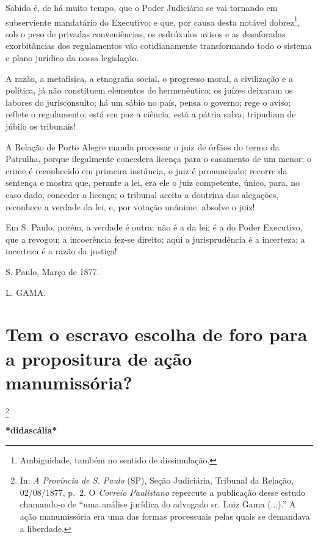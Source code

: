 Sabido é, de há muito tempo, que o Poder Judiciário se vai tornando em
subserviente mandatário do Executivo; e que, por causa desta notável
dobrez\footnote{Ambiguidade, também no sentido de dissimulação.}, sob o
peso de privadas conveniências, os esdrúxulos avisos e as desaforadas
exorbitâncias dos regulamentos vão cotidianamente transformando todo o
sistema e plano jurídico da nossa legislação.

A razão, a metafísica, a etnografia social, o progresso moral, a
civilização e a política, já não constituem elementos de hermenêutica;
os juízes deixaram os labores do jurisconsulto; há um sábio no país,
pensa o governo; rege o aviso; reflete o regulamento; está em paz a
ciência; está a pátria salva; tripudiam de júbilo os tribunais!

A Relação de Porto Alegre manda processar o juiz de órfãos do termo da
Patrulha, porque ilegalmente concedera licença para o casamento de um
menor; o crime é reconhecido em primeira instância, o juiz é
pronunciado; recorre da sentença e mostra que, perante a lei, era ele o
juiz competente, único, para, no caso dado, conceder a licença; o
tribunal aceita a doutrina das alegações, reconhece a verdade da lei, e,
por votação unânime, absolve o juiz!

Em S. Paulo, porém, a verdade é outra: não é a da lei; é a do Poder
Executivo, que a revogou; a incoerência fez-se direito; aqui a
jurisprudência é a incerteza; a incerteza é a razão da justiça!

S. Paulo, Março de 1877.

L. GAMA.

\chapter{Tem o escravo escolha de foro para a propositura de ação
manumissória?}

\footnote{In: \emph{A Província de S. Paulo} (SP), Seção Judiciária,
  Tribunal da Relação, 02/08/1877, p.~2. O \emph{Correio Paulistano}
  repercute a publicação desse estudo chamando-o de ``uma análise
  jurídica do advogado sr. Luiz Gama (...).'' A ação manumissória era
  uma das formas processuais pelas quais se demandava a liberdade.}

\textbf{*didascália*}

